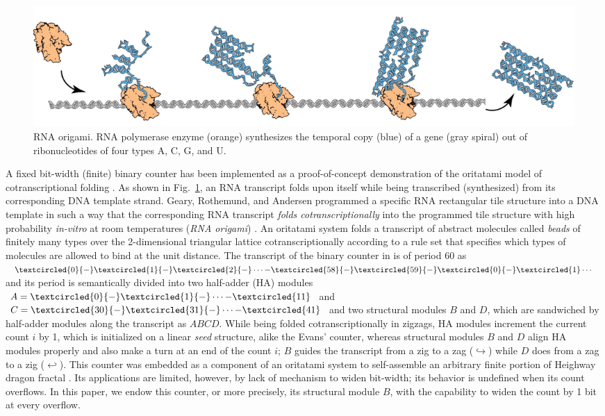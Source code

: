 \documentclass[twocolumn]{svjour3}
\begin{document}
\begin{figure}[tb]
\centering
\includegraphics[width=\linewidth]{fig/rna_origami.pdf}
\caption{RNA origami. RNA polymerase enzyme (orange) synthesizes the temporal copy (blue) of a gene (gray spiral) out of ribonucleotides of four types A, C, G, and U.}
\label{fig:rna_origami}
\end{figure}

A fixed bit-width (finite) binary counter has been implemented as a proof-of-concept demonstration of the oritatami model of cotranscriptional folding \cite{GeMeScSe2019}. 
As shown in Fig.~\ref{fig:rna_origami}, an RNA transcript folds upon itself while being transcribed (synthesized) from its corresponding DNA template strand. 
Geary, Rothemund, and Andersen programmed a specific RNA rectangular tile structure into a DNA template in such a way that the corresponding RNA transcript \textit{folds cotranscriptionally} into the programmed tile structure with high probability \textit{in-vitro} at room temperatures (\textit{RNA origami}) \cite{GearyRothemundAndersen2014}. 
An oritatami system folds a transcript of abstract molecules called \textit{beads} of finitely many types over the 2-dimensional triangular lattice cotranscriptionally according to a rule set that specifies which types of molecules are allowed to bind at the unit distance. 
The transcript of the binary counter in \cite{GeMeScSe2019} is of period 60 as $\textcircled{\scriptsize 0}{-}\textcircled{\scriptsize 1}{-}\textcircled{\scriptsize 2}{-} \cdots {-}\textcircled{\scriptsize 58}{-}\textcircled{\scriptsize 59}{-}\textcircled{\scriptsize 0}{-}\textcircled{\scriptsize 1} \cdots$ and its period is semantically divided into two half-adder (HA) modules $A = \textcircled{\scriptsize 0}{-}\textcircled{\scriptsize 1}{-} \cdots {-}\textcircled{\scriptsize 11}$ and $C = \textcircled{\scriptsize 30}{-}\textcircled{\scriptsize 31}{-} \cdots {-}\textcircled{\scriptsize 41}$ and two structural modules $B$ and $D$, which are sandwiched by half-adder modules along the transcript as $ABCD$.
While being folded cotranscriptionally in zigzags, HA modules increment the current count $i$ by 1, which is initialized on a linear \textit{seed} structure, alike the Evans' counter, whereas structural modules $B$ and $D$ align HA modules properly and also make a turn at an end of the count $i$; $B$ guides the transcript from a zig to a zag ($\hookrightarrow$) while $D$ does from a zag to a zig ($\hookleftarrow$). 
This counter was embedded as a component of an oritatami system to self-assemble an arbitrary finite portion of Heighway dragon fractal \cite{MasudaSekiUbukata2018}. 
Its applications are limited, however, by lack of mechanism to widen bit-width; its behavior is undefined when its count overflows. 
In this paper, we endow this counter, or more precisely, its structural module $B$, with the capability to widen the count by 1 bit at every overflow. 
\end{document}
